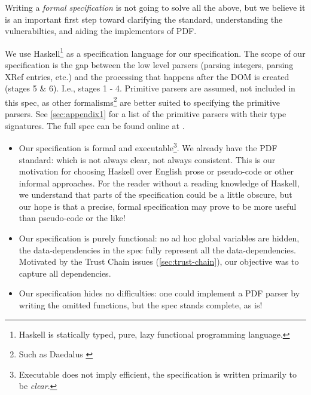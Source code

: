 Writing a \emph{formal specification} is not going to solve all the above,
but we believe it is an important first step toward clarifying the
standard, understanding the vulnerabilties, and aiding the
implementors of PDF.

We use Haskell\footnote{
Haskell is statically typed, pure, lazy functional programming
language\cite{Haskell}.
}
as a specification language for our specification.
%
The scope of our specification is the gap between the low
level parsers (parsing integers, parsing XRef entries, etc.) and the
processing that happens after the DOM is created (stages 5 \& 6).
I.e., stages 1 - 4.
%
Primitive parsers are assumed, not included in this spec,
as other formalisms\footnote{Such as Daedalus \cite{daedaluspaper,daedalusrepo}}
are better suited to specifying the primitive parsers.
See \cref{sec:appendix1} for a list of the primitive parsers
with their type signatures.
%
The full spec can be found online at \cite{daedalusrepo}.

\begin{itemize}
\item Our specification is formal and executable\footnote{
  Executable does not imply efficient, the specification is written
  primarily to be \emph{clear}.}.
  We already have the PDF standard: which is not always clear, not always
  consistent. 
  This is our motivation for choosing Haskell over English prose or
  pseudo-code or other informal approaches.
  For the reader
  without a reading knowledge of Haskell, we understand that parts of
  the specification could be a little obscure, but our hope is that a
  precise, formal specification may prove to be more useful than
  pseudo-code or the like!
  
\item Our specification is purely functional: no ad hoc global variables are
  hidden, the data-dependencies in the spec fully represent all the
  data-dependencies.  Motivated by the Trust Chain issues
  (\cref{sec:trust-chain}), our objective was to capture all dependencies.
  
\item Our specification hides no difficulties: one could implement a PDF parser
  by writing the omitted functions, but the spec stands complete, as
  is!
\end{itemize}


